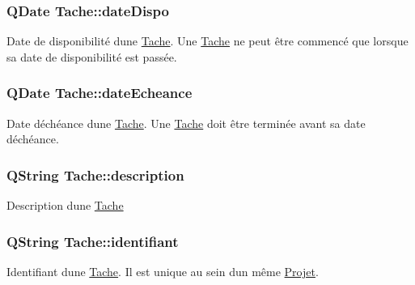 \subsubsection[{date\+Dispo}]{\setlength{\rightskip}{0pt plus 5cm}Q\+Date Tache\+::date\+Dispo\hspace{0.3cm}{\ttfamily [protected]}}\label{class_tache_ac8758b826b1be639dad8bcb556659a36}
Date de disponibilité d\textquotesingle{}une \hyperlink{class_tache}{Tache}. Une \hyperlink{class_tache}{Tache} ne peut être commencé que lorsque sa date de disponibilité est passée. \hypertarget{class_tache_a7671c127da40ae35075f069a64396f45}{}
\subsubsection[{date\+Echeance}]{\setlength{\rightskip}{0pt plus 5cm}Q\+Date Tache\+::date\+Echeance\hspace{0.3cm}{\ttfamily [protected]}}\label{class_tache_a7671c127da40ae35075f069a64396f45}
Date d\textquotesingle{}échéance d\textquotesingle{}une \hyperlink{class_tache}{Tache}. Une \hyperlink{class_tache}{Tache} doit être terminée avant sa date d\textquotesingle{}échéance. \hypertarget{class_tache_ab3d06410b2c62ebfbe20f570c41dc4d4}{}
\subsubsection[{description}]{\setlength{\rightskip}{0pt plus 5cm}Q\+String Tache\+::description\hspace{0.3cm}{\ttfamily [protected]}}\label{class_tache_ab3d06410b2c62ebfbe20f570c41dc4d4}
Description d\textquotesingle{}une \hyperlink{class_tache}{Tache} \hypertarget{class_tache_a9af1773c9b835900bba8814cccee450e}{}
\subsubsection[{identifiant}]{\setlength{\rightskip}{0pt plus 5cm}Q\+String Tache\+::identifiant\hspace{0.3cm}{\ttfamily [protected]}}\label{class_tache_a9af1773c9b835900bba8814cccee450e}
Identifiant d\textquotesingle{}une \hyperlink{class_tache}{Tache}. Il est unique au sein d\textquotesingle{}un même \hyperlink{class_projet}{Projet}. \hypertarget{class_tache_a0f73920789e27b7c2aeb47d171d5e543}{}
